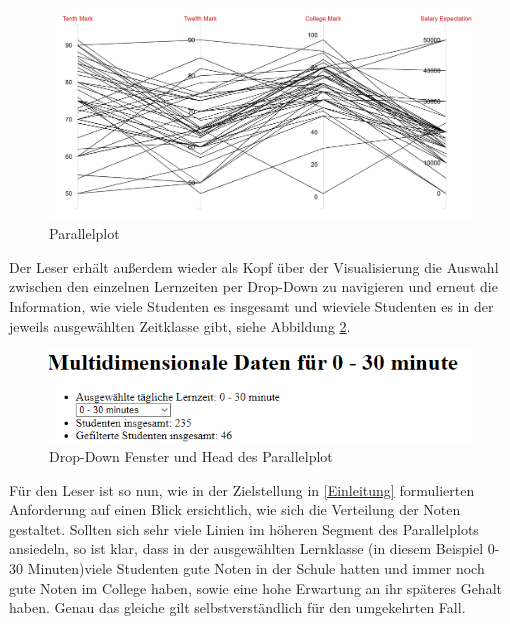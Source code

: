 \documentclass[usegeometry=true]{scrartcl}
\begin{document}
\begin{figure}[h]
\begin{center}
	\includegraphics[scale=0.35]{ParallelPlot.png}
	\caption{Parallelplot}
	\label{Parallel}
\end{center}
\end{figure}

\noindent Der Leser erhält außerdem wieder als Kopf über der Visualisierung die Auswahl zwischen den einzelnen Lernzeiten per Drop-Down zu navigieren und erneut die Information, wie viele Studenten es insgesamt und wieviele Studenten es in der jeweils ausgewählten Zeitklasse gibt, siehe Abbildung \ref{ParallelDrop}. \pagebreak


\begin{figure}[h]
\begin{center}
	\includegraphics[scale=1]{ParallelDrop.png}
	\caption{Drop-Down Fenster und Head des Parallelplot}
	\label{ParallelDrop}
\end{center}
\end{figure}


\noindent Für den Leser ist so nun, wie in der Zielstellung in \ref{Einleitung} formulierten Anforderung auf einen Blick ersichtlich, wie sich die Verteilung der Noten gestaltet. Sollten sich sehr viele Linien im höheren Segment des Parallelplots ansiedeln, so ist klar, dass in der ausgewählten Lernklasse (in diesem Beispiel 0-30 Minuten)viele Studenten gute Noten in der Schule hatten und immer noch gute Noten im College haben, sowie eine hohe Erwartung an ihr späteres Gehalt haben. Genau das gleiche gilt selbstverständlich für den umgekehrten Fall.\\
\end{document}
